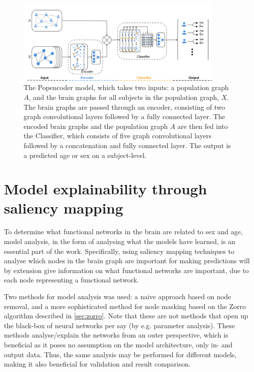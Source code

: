 \begin{figure}[!htbp]
    \centering
    \includegraphics[width=0.9\textwidth]{chapters/images_methods/popencoder_v2.png}
    \caption{The Popencoder model, which takes two inputs: a population graph $A$, and the brain graphs for all subjects in the population graph, $X$. The brain graphs are passed through an encoder, consisting of two graph convolutional layers followed by a fully connected layer. The encoded brain graphs and the population graph $A$ are then fed into the Classifier, which consists of five graph convolutional layers followed by a concatenation and fully connected layer. The output is a predicted age or sex on a subject-level.}
    \label{fig:popencoder}
\end{figure}

\section{Model explainability through saliency mapping}
To determine what functional networks in the brain are related to sex and age, model analysis, in the form of analysing what the models have learned, is an essential part of the work. Specifically, using saliency mapping techniques to analyse which nodes in the brain graph are important for making predictions will by extension give information on what functional networks are important, due to each node representing a functional network. 

Two methods for model analysis was used: a naive approach based on node removal, and a more sophisticated method for node masking based on the Zorro algorithm described in \cref{sec:zorro}. Note that these are not methods that open up the black-box of neural networks per say (by e.g. parameter analysis). These methods analyse/explain the networks from an outer perspective, which is beneficial as it poses no assumption on the model architecture, only in- and output data. Thus, the same analysis may be performed for different models, making it also beneficial for validation and result comparison. 


